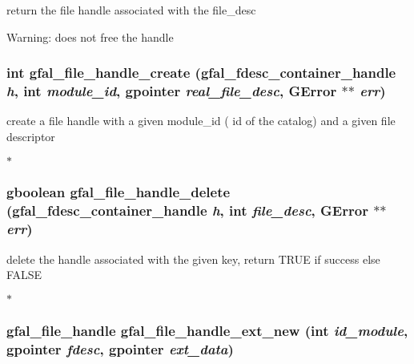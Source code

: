 return the file handle associated with the file\_\-desc \begin{Desc}
\item[Warning:]does not free the handle \end{Desc}
\subsubsection{\setlength{\rightskip}{0pt plus 5cm}int gfal\_\-file\_\-handle\_\-create (gfal\_\-fdesc\_\-container\_\-handle {\em h}, int {\em module\_\-id}, gpointer {\em real\_\-file\_\-desc}, GError $\ast$$\ast$ {\em err})}\label{gfal__common__filedescriptor_8h_9cfac852697441bd0289e9900960854c}


create a file handle with a given module\_\-id ( id of the catalog) and a given file descriptor

$\ast$ 
\subsubsection{\setlength{\rightskip}{0pt plus 5cm}gboolean gfal\_\-file\_\-handle\_\-delete (gfal\_\-fdesc\_\-container\_\-handle {\em h}, int {\em file\_\-desc}, GError $\ast$$\ast$ {\em err})}\label{gfal__common__filedescriptor_8h_5434be84154718254a4e90dbcc196359}


delete the handle associated with the given key, return TRUE if success else FALSE

$\ast$ 
\subsubsection{\setlength{\rightskip}{0pt plus 5cm}gfal\_\-file\_\-handle gfal\_\-file\_\-handle\_\-ext\_\-new (int {\em id\_\-module}, gpointer {\em fdesc}, gpointer {\em ext\_\-data})}\label{gfal__common__filedescriptor_8h_b2ae28c9bade093c2f1fea46f549fbee}


